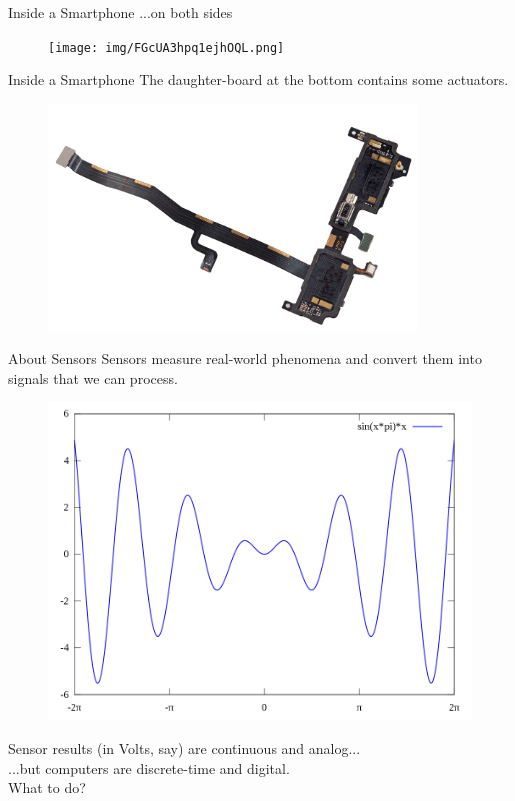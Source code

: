 \documentclass{beamer}
\begin{document}
	\begin{frame}{Inside a Smartphone}
		...on both sides
		\begin{figure}[b]
		\centering
		\texttt{[image: img/FGcUA3hpq1ejhOQL.png]}
		\end{figure}
	\end{frame}
  
	\begin{frame}{Inside a Smartphone}
		The daughter-board at the bottom contains some actuators.
		\begin{figure}[b]
		\centering
		\includegraphics[width=\textwidth,height=6cm,keepaspectratio]{img/wdnGHA1UB3lBpZIL.png}
		\end{figure}
	\end{frame}    
	
	\begin{frame}[t]{About Sensors}
		\small Sensors measure real-world phenomena and convert them into signals that we can process.	\\
		\vspace{0.5em}
		\begin{figure}
			\centering
			\includegraphics[width=\textwidth,height=0.6\textheight,keepaspectratio]{img/sine.png}
		\end{figure}
		Sensor results (in Volts, say) are continuous and analog...	\\	
		\hspace{2em}...but computers are discrete-time and digital. \\	
		\vspace{2em}		
		What to do? \\
	\end{frame}
	
\end{document}

